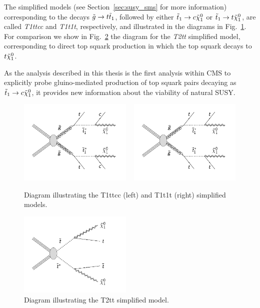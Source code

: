 The simplified models (see Section~\ref{sec:susy_sms} for more information) corresponding to the
decays $\tilde{g} \rightarrow t \tilde{t}_1$, followed by either $\tilde{t}_1 \rightarrow c \tilde{\chi}_1^0$ or
$\tilde{t}_1 \rightarrow t \tilde{\chi}_1^0$, are called \textit{T1ttcc} and \textit{T1t1t}, respectively, and
illustrated in the diagrams in Fig.~\ref{fig:T1ttcc_T1t1t_diagrams}. For comparison we show in
Fig.~\ref{fig:T2tt_diagram} the diagram for the \textit{T2tt} simplified model, corresponding to
direct top squark production in which the top squark decays to $t \tilde{\chi}_1^0$. 

As the analysis described in this thesis is the first analysis within CMS to explicitly probe
gluino-mediated production of top squark pairs decaying as $\tilde{t}_1 \rightarrow c \tilde{\chi}_1^0$, it
provides new information about the viability of natural SUSY. 

\begin{figure}
  \centering
  \includegraphics[width=0.48\textwidth,clip=true,trim=0 0.7cm 0 0]
{figures/razor_interpretation/T1ttcc}
  ~
  \includegraphics[width=0.48\textwidth,clip=true,trim=0 0.7cm 0 0]
{figures/razor_interpretation/T1t1t}
  \caption{Diagram illustrating the T1ttcc (left) and T1t1t (right) simplified models.
  \label{fig:T1ttcc_T1t1t_diagrams}}
\end{figure}

\begin{figure}
  \centering
  \includegraphics[width=0.48\textwidth,clip=true,trim=0 0.7cm 0 0]{figures/razor_motivation/T2tt}
  \caption{Diagram illustrating the T2tt simplified model.
  \label{fig:T2tt_diagram}}
\end{figure}


